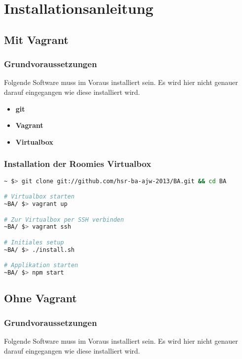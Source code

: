 \chapter{Installationsanleitung}

\section{Mit Vagrant}

\subsection*{Grundvoraussetzungen}
Folgende Software muss im Voraus installiert sein. Es wird hier nicht genauer
darauf eingegangen wie diese installiert wird.

\begin{itemize}
	\item \textbf{git} \cite{git}
	\item \textbf{Vagrant} \cite{Vagrant}
	\item \textbf{Virtualbox} \cite{Virtualbox}
\end{itemize}

\subsection*{Installation der Roomies Virtualbox}

\begin{lstlisting}[language=Bash, caption=Installationsanleitung Vagrant]
~ $> git clone git://github.com/hsr-ba-ajw-2013/BA.git && cd BA

# Virtualbox starten
~BA/ $> vagrant up

# Zur Virtualbox per SSH verbinden
~BA/ $> vagrant ssh

# Initiales setup
~BA/ $> ./install.sh

# Applikation starten
~BA/ $> npm start
\end{lstlisting}

\section{Ohne Vagrant}

\subsection*{Grundvoraussetzungen}
Folgende Software muss im Voraus installiert sein. Es wird hier nicht genauer
darauf eingegangen wie diese installiert wird.

